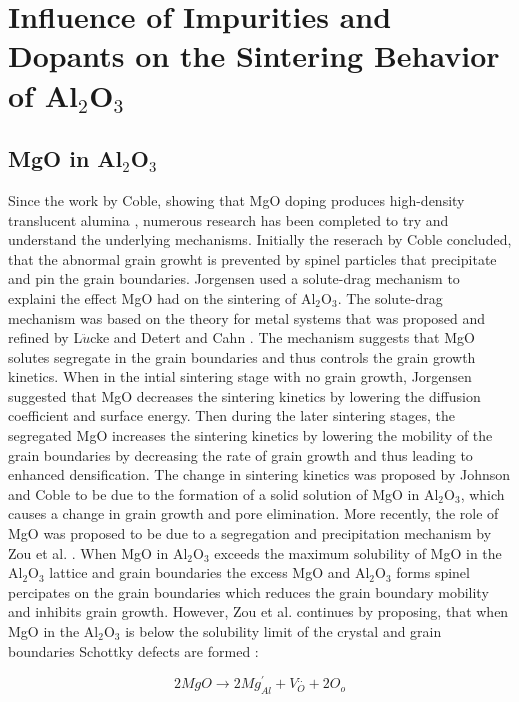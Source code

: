 \section{Influence of Impurities and Dopants on the Sintering Behavior of Al$_{2}$O$_{3}$}

\subsection{MgO in Al$_{2}$O$_{3}$}

Since the work by Coble, showing that MgO doping produces high-density translucent alumina \cite{Coble1961,Coble1962,Coble1962a}, numerous research has been completed to try and understand the underlying mechanisms. Initially the reserach by Coble concluded, that the abnormal grain growht is prevented by spinel particles that precipitate and pin the grain boundaries. Jorgensen \cite{Jorgensen1964,Jorgensen1965} used a solute-drag mechanism to explaini the effect MgO had on the sintering of Al$_{2}$O$_{3}$. The solute-drag mechanism was based on the theory for metal systems that was proposed and refined by L$\ddot{u}$cke and Detert \cite{Lucke1957} and Cahn \cite{Cahn1962}. The mechanism suggests that MgO solutes segregate in the grain boundaries and thus controls the grain growth kinetics. When in the intial sintering stage with no grain growth, Jorgensen suggested that MgO decreases the sintering kinetics by lowering the diffusion coefficient and surface energy. Then during the later sintering stages, the segregated MgO increases the sintering kinetics by lowering the mobility of the grain boundaries by decreasing the rate of grain growth and thus leading to enhanced densification. The change in sintering kinetics was proposed by Johnson and Coble \cite{Johnson1978} to be due to the formation of a solid solution of MgO in Al$_{2}$O$_{3}$, which causes a change in grain growth and pore elimination. More recently, the role of MgO was proposed to be due to a segregation and precipitation mechanism by Zou et al. \cite{Zuo2013}. When MgO in Al$_{2}$O$_{3}$ exceeds the maximum solubility of MgO in the Al$_{2}$O$_{3}$ lattice and grain boundaries the excess MgO and Al$_{2}$O$_{3}$ forms spinel percipates on the grain boundaries which reduces the grain boundary mobility and inhibits grain growth. However, Zou et al. \cite{Zuo2013} continues by proposing, that when MgO in the Al$_{2}$O$_{3}$ is below the solubility limit of the crystal and grain boundaries Schottky defects are formed :

\begin{equation}
\label{Ch1-eq: 1}
2MgO \rightarrow 2Mg_{Al}^{'} + V^{..}_{O} + 2O_{o}
\end{equation}
	
